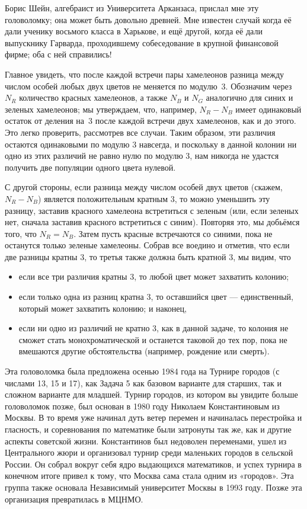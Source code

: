 Борис Шейн, алгебраист из Университета Арканзаса, прислал мне эту головоломку; она может быть довольно древней.
Мне известен случай когда её дали ученику восьмого класса в Харькове,
и ещё другой, когда её дали выпускнику Гарварда, проходившему собеседование в крупной финансовой фирме;
оба с ней справились!

Главное увидеть, что после каждой встречи пары хамелеонов разница между числом особей любых двух цветов не меняется по модулю~3.
Обозначим через $N_R$ количество красных хамелеонов,
а также $N_B$ и $N_G$ аналогично для синих и зеленых хамелеонов;
мы утверждаем, что, например, $N_R - N_B$ имеет одинаковый остаток от деления на~3 после каждой встречи двух хамелеонов, как и до этого.
Это легко проверить, рассмотрев все случаи.
Таким образом, эти различия остаются одинаковыми по модулю 3 навсегда, и поскольку в данной колонии ни одно из этих различий не равно нулю по модулю 3, нам никогда не удастся получить две популяции одного цвета нулевой.

С другой стороны, если разница между числом особей двух цветов (скажем, $N_R - N_B$) является положительным кратным $3$, то можно уменьшить эту разницу, заставив красного хамелеона встретиться с зеленым (или, если зеленых нет, сначала заставив красного встретиться с синим).
Повторяя это, мы добьёмся того, что $N_R = N_B$.
Затем пусть красные встречаются со синими, пока не останутся только зеленые хамелеоны.
Собрав все воедино и отметив, что если две разницы кратны $3$, то третья также должна быть кратной $3$, мы видим, что
\begin{itemize}
\item если все три различия кратны 3, то любой цвет может захватить колонию;
\item если только одна из разниц кратна 3, то оставшийся цвет --- единственный, который может захватить колонию; и наконец,
\item если ни одно из различий не кратно 3, как в данной задаче, то колония не сможет стать монохроматической и останется таковой до тех пор, пока не вмешаются другие обстоятельства (например, рождение или смерть).
\end{itemize}

Эта головоломка была предложена осенью 1984 года на Турнире городов (с числами 13, 15 и 17), как Задача 5 как базовом варианте для старших, так и сложном варианте для младшей.
Турнир городов, из котором вы увидите больше головоломок позже, был основан в 1980 году Николаем Константиновым из Москвы.
В то время уже начинал дуть ветер перемен и начиналась перестройка и гласность, и соревнования по математике были затронуты так же, как и другие аспекты советской жизни.
Константинов был недоволен переменами, ушел из Центрального жюри и организовал турнир среди маленьких городов в сельской России.
Он собрал вокруг себя ядро выдающихся математиков, и успех турнира в конечном итоге привел к тому, что Москва сама стала одним из «городов».
Эта группа также основала Независимый университет Москвы в 1993 году.
Позже эта организация превратилась в МЦНМО.

